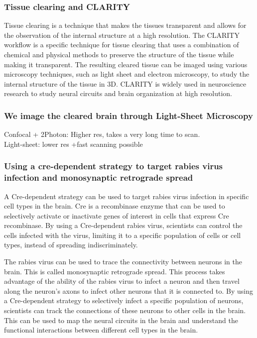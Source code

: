 \begin{itemize}
\begin{itemize}
\subsubsection{Tissue clearing and CLARITY}
Tissue clearing is a technique that makes the tissues transparent and allows for the observation of the internal structure at a high resolution. The CLARITY workflow is a specific technique for tissue clearing that uses a combination of chemical and physical methods to preserve the structure of the tissue while making it transparent. The resulting cleared tissue can be imaged using various microscopy techniques, such as light sheet and electron microscopy, to study the internal structure of the tissue in 3D. CLARITY is widely used in neuroscience research to study neural circuits and brain organization at high resolution.
\subsubsection{We image the cleared brain through Light-Sheet Microscopy}
Confocal + 2Photon: Higher res, takes a very long time to scan.
\\Light-sheet: lower res +fast scanning possible
\subsubsection{Using a cre-dependent strategy to target rabies virus infection and monosynaptic retrograde spread}
A Cre-dependent strategy can be used to target rabies virus infection in specific cell types in the brain. Cre is a recombinase enzyme that can be used to selectively activate or inactivate genes of interest in cells that express Cre recombinase. By using a Cre-dependent rabies virus, scientists can control the cells infected with the virus, limiting it to a specific population of cells or cell types, instead of spreading indiscriminately.

The rabies virus can be used to trace the connectivity between neurons in the brain. This is called monosynaptic retrograde spread. This process takes advantage of the ability of the rabies virus to infect a neuron and then travel along the neuron's axons to infect other neurons that it is connected to. By using a Cre-dependent strategy to selectively infect a specific population of neurons, scientists can track the connections of these neurons to other cells in the brain. This can be used to map the neural circuits in the brain and understand the functional interactions between different cell types in the brain.


\end{itemize}
\end{itemize}
